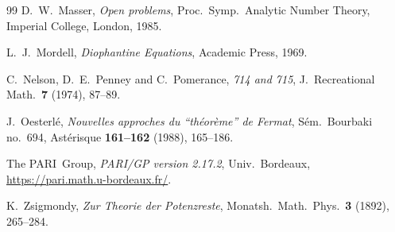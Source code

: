 \documentclass[11pt]{article}
\theoremstyle{definition}
\theoremstyle{remark}
\begin{document}
\begin{thebibliography}{99}
 D.~W.~Masser, \emph{Open problems}, Proc.\ Symp.\ Analytic
Number Theory, Imperial College, London, 1985.

 L.~J.~Mordell, \emph{Diophantine Equations}, Academic Press,
1969.

 C.~Nelson, D.~E.~Penney and C.~Pomerance, \emph{714 and 715},
J.\ Recreational Math.\ \textbf{7} (1974), 87--89.

 J.~Oesterl\'e, \emph{Nouvelles approches du ``th\'eor\`eme''
de Fermat}, S\'em.\ Bourbaki no.~694, Ast\'erisque \textbf{161--162} (1988),
165--186.

 The PARI~Group, \emph{PARI/GP version 2.17.2}, Univ.\ Bordeaux,
\url{https://pari.math.u-bordeaux.fr/}.

 K.~Zsigmondy, \emph{Zur Theorie der Potenzreste}, Monatsh.\
Math.\ Phys.\ \textbf{3} (1892), 265--284.

\end{thebibliography}
\end{document}
